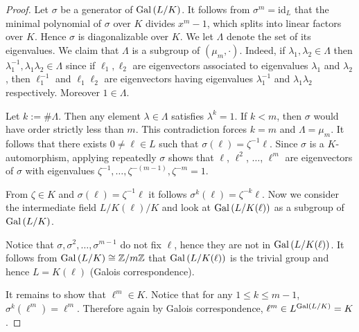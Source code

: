 \documentclass[twoside = false,	%
		headsepline,		%
		parskip = true,
		]{scrbook}						%
\begin{document}
    \begin{proof}
    {\color{blue} Let $\sigma$ be a generator of $\mathrm{Gal}\left( L/K\right)$. It follows from $\sigma^m=\mathrm{id}_L$ that the minimal polynomial of $\sigma$ over $K$ divides $x^m-1$, which splits into linear factors over $K$. Hence $\sigma$ is diagonalizable over $K$. We let $\Lambda$ denote the set of its eigenvalues. We claim that $\Lambda$ is a subgroup of $(\mu_m,\cdot)$. Indeed, if $\lambda_1,\lambda_2\in\Lambda$ then $\lambda_1^{-1},\lambda_1\lambda_2\in\Lambda$ since if $\ell_1,\ell_2$ are eigenvectors associated to eigenvalues $\lambda_1$ and $\lambda_2$, then $\ell_1^{-1}$ and $\ell_1\ell_2$ are eigenvectors having eigenvalues $\lambda_1^{-1}$ and $\lambda_1\lambda_2$ respectively.} {\color{green} Moreover $1 \in \Lambda$.}
    
    {\color{blue} Let $k:=\#\Lambda$. Then any element $\lambda\in\Lambda$ satisfies $\lambda^k=1$. If $k<m$, then $\sigma$ would have order strictly less than $m$. This contradiction forces $k=m$ and $\Lambda=\mu_m$. It follows that there exists $0\neq \ell\in L$ such that $\sigma(\ell)=\zeta^{-1}\ell$. Since $\sigma$ is a $K$-automorphism, applying repeatedly $\sigma$ shows that $\ell$, $\ell^2$, $\ldots$, $\ell^m$ are eigenvectors of $\sigma$ with eigenvalues $\zeta^{-1},\ldots,\zeta^{-(m-1)},\zeta^{-m}=1$.}
        
        From $\zeta \in K$ and $\sigma(\ell) = \zeta^{-1} \ell$ it follows $\sigma^k(\ell) = \zeta^{-k} \ell$. Now we consider the intermediate field $L/K(\ell)/K$ and look at $\mathrm{Gal}\left( L/K(\ell)\right)$ as a subgroup of $\mathrm{Gal}\left( L/K\right)$.
        
        Notice that $\sigma,\sigma^2,\dots,\sigma^{m-1}$ do not fix $\ell$, hence they are not in $\mathrm{Gal}\left( L/K(\ell)\right)$. It follows from $\mathrm{Gal}\left( L/K\right) \cong \mathbb Z/m\mathbb Z$ that $\mathrm{Gal}\left( L/K(\ell)\right)$ is the trivial group and hence $L = K(\ell)$ (Galois correspondence).
        
        It remains to show that $\ell^m \in K$. Notice that for any $1 \leq k \leq m-1$, $\sigma^k(\ell^m) = \ell^m$. Therefore again by Galois correspondence, $\ell^m \in L^{\mathrm{Gal}\left( L/K\right)} = K$.
    \end{proof}
    
\end{document}

